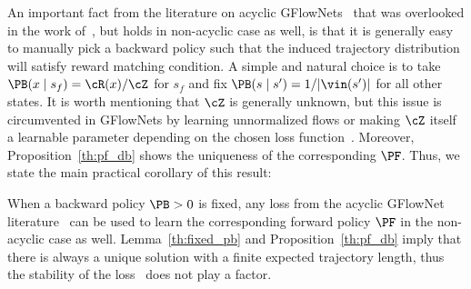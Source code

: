 An important fact from the literature on acyclic GFlowNets~\cite{malkin2022trajectory, bengio2023gflownet} that was overlooked in the work of~\cite{brunswic2024theory}, but holds in non-acyclic case as well, is that it is generally easy to manually pick a backward policy such that the induced trajectory distribution will satisfy reward matching condition. A simple and natural choice is to take $\PB(x \mid s_f) = \cR(x) / \cZ$ for $s_f$ and fix $\PB(s \mid s') = 1 / |\vin(s')|$ for all other states. It is worth mentioning that $\cZ$ is generally unknown, but this issue is circumvented in GFlowNets by learning unnormalized flows or making $\cZ$ itself a learnable parameter depending on the chosen loss function~\cite{malkin2022trajectory, bengio2023gflownet, madan2023learning}. Moreover, Proposition~\ref{th:pf_db} shows the uniqueness of the corresponding $\PF$. Thus, we state the main practical corollary of this result:
\begin{corollary}\label{th:fix_pb_learning}
    When a backward policy $\PB > 0$ is fixed, any loss from the acyclic GFlowNet literature~\cite{bengio2021flow, malkin2022trajectory, bengio2023gflownet, madan2023learning} can be used to learn the corresponding forward policy $\PF$ in the non-acyclic case as well. Lemma~\ref{th:fixed_pb} and Proposition~\ref{th:pf_db} imply that there is always a unique solution with a finite expected trajectory length, thus the stability of the loss~\cite{brunswic2024theory} does not play a factor.
\end{corollary}

